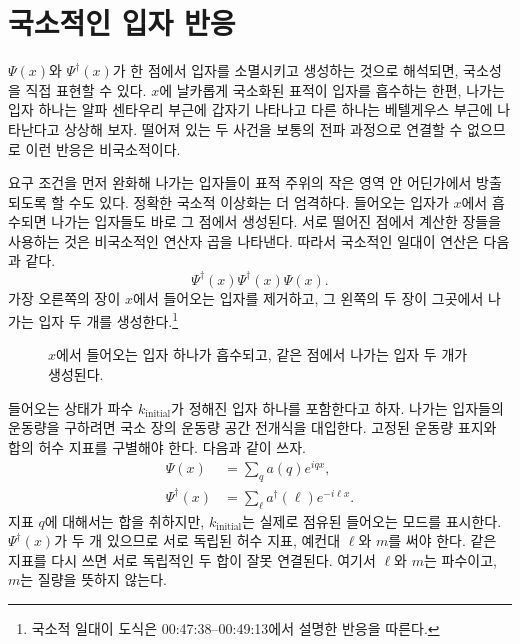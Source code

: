 \section{국소적인 입자 반응}

\(\Psi(x)\)와 \(\Psi^\dagger(x)\)가 한 점에서 입자를 소멸시키고 생성하는 것으로 해석되면, 국소성을 직접 표현할 수 있다. \(x\)에 날카롭게 국소화된 표적이 입자를 흡수하는 한편, 나가는 입자 하나는 알파 센타우리 부근에 갑자기 나타나고 다른 하나는 베텔게우스 부근에 나타난다고 상상해 보자. 떨어져 있는 두 사건을 보통의 전파 과정으로 연결할 수 없으므로 이런 반응은 비국소적이다.

요구 조건을 먼저 완화해 나가는 입자들이 표적 주위의 작은 영역 안 어딘가에서 방출되도록 할 수도 있다. 정확한 국소적 이상화는 더 엄격하다. 들어오는 입자가 \(x\)에서 흡수되면 나가는 입자들도 바로 그 점에서 생성된다. 서로 떨어진 점에서 계산한 장들을 사용하는 것은 비국소적인 연산자 곱을 나타낸다. 따라서 국소적인 일대이 연산은 다음과 같다.
\begin{equation}
\Psi^\dagger(x)\Psi^\dagger(x)\Psi(x).
\end{equation}
가장 오른쪽의 장이 \(x\)에서 들어오는 입자를 제거하고, 그 왼쪽의 두 장이 그곳에서 나가는 입자 두 개를 생성한다.\footnote{국소적 일대이 도식은 00:47:38--00:49:13에서 설명한 반응을 따른다.}

\begin{figure}[t]\centering
{}\caption{\(x\)에서 들어오는 입자 하나가 흡수되고, 같은 점에서 나가는 입자 두 개가 생성된다.}\end{figure}

들어오는 상태가 파수 \(k_{\mathrm{initial}}\)가 정해진 입자 하나를 포함한다고 하자. 나가는 입자들의 운동량을 구하려면 국소 장의 운동량 공간 전개식을 대입한다. 고정된 운동량 표지와 합의 허수 지표를 구별해야 한다. 다음과 같이 쓰자.
\begin{align}
\Psi(x)&=\sum_q a(q)e^{iqx},\\
\Psi^\dagger(x)&=\sum_\ell a^\dagger(\ell)e^{-i\ell x}.
\end{align}
지표 \(q\)에 대해서는 합을 취하지만, \(k_{\mathrm{initial}}\)는 실제로 점유된 들어오는 모드를 표시한다. \(\Psi^\dagger(x)\)가 두 개 있으므로 서로 독립된 허수 지표, 예컨대 \(\ell\)와 \(m\)를 써야 한다. 같은 지표를 다시 쓰면 서로 독립적인 두 합이 잘못 연결된다. 여기서 \(\ell\)와 \(m\)는 파수이고, \(m\)는 질량을 뜻하지 않는다.

